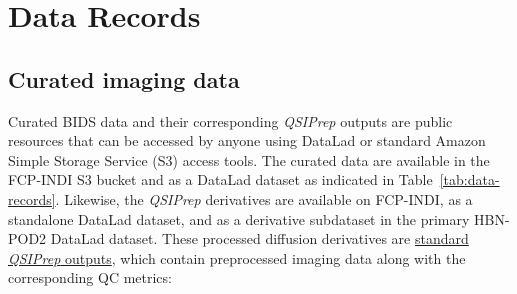 \documentclass[fleqn,10pt,inline]{wlscirep}
\begin{document}
\section*{Data Records}

\subsection*{Curated imaging data}

Curated BIDS data and their corresponding \emph{QSIPrep} outputs are public resources that can be accessed by anyone using DataLad\cite{datalad} or standard Amazon Simple Storage Service (S3) access tools. The curated data are available in the FCP-INDI S3 bucket and as a DataLad dataset\cite{hbnpod2data} as indicated in Table~\ref{tab:data-records}.
Likewise, the \emph{QSIPrep} derivatives are available on FCP-INDI, as a standalone DataLad dataset\cite{hbnpod2qsiprepdata}, and as a derivative subdataset in the primary HBN-POD2 DataLad dataset\cite{hbnpod2data}.
These processed diffusion derivatives are \href{
https://qsiprep.readthedocs.io/en/latest/preprocessing.html#outputs-of-qsiprep}{
standard \emph{QSIPrep} outputs}, which contain preprocessed imaging data
along with the corresponding QC metrics:
\end{document}
